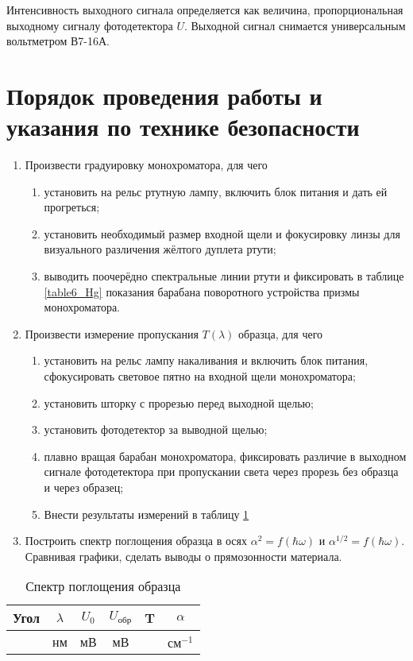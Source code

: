 Интенсивность выходного сигнала определяется как величина, пропорциональная выходному сигналу фотодетектора $U$. Выходной сигнал снимается универсальным вольтметром В7-16А.

\section{Порядок проведения работы и указания по технике безопасности}

\begin{enumerate}
\item Произвести градуировку монохроматора, для чего 
	\begin{enumerate}
	\item установить на рельс ртутную лампу, включить блок питания и дать ей прогреться;
	\item установить необходимый размер входной щели и фокусировку линзы для визуального различения жёлтого дуплета ртути;
	\item выводить поочерёдно спектральные линии ртути и фиксировать в таблице \ref{table6_Hg} показания барабана поворотного устройства призмы монохроматора.
	\end{enumerate}
\item Произвести измерение пропускания $T(\lambda)$ образца, для чего
	\begin{enumerate}
	\item установить на рельс лампу накаливания и включить блок питания, сфокусировать световое пятно на входной щели монохроматора;
	\item установить шторку с прорезью перед выходной щелью;
	\item установить фотодетектор за выводной щелью;
	\item плавно вращая барабан монохроматора, фиксировать различие в выходном сигнале фотодетектора при пропускании света через прорезь без образца и через образец;
	\item Внести результаты измерений в таблицу \ref{table6_data}
	\end{enumerate}
\item Построить спектр поглощения образца в осях $\alpha^2 = f(\hbar \omega)$ и $\alpha^{1/2} = f(\hbar \omega)$. Сравнивая графики, сделать выводы о прямозонности материала.
\end{enumerate}

\begin{table}[h!]
\caption{Спектр поглощения образца}
\begin{center}
\begin{tabular}{c|c|c|c|c|c}
Угол & $\lambda$ & $U_{0}$ & $U_{\text{обр}}$ & T & $\alpha$ \\
\hline
 & нм & мВ & мВ &  & $\text{см}^{-1}$ \\
\hline
\end{tabular}
\end{center}
\label{table6_data}
\end{table}

